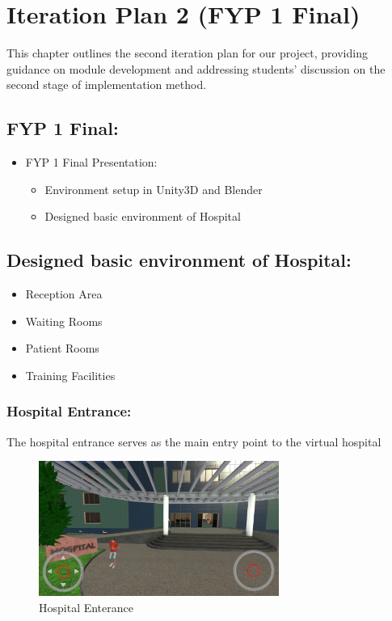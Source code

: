 \chapter{Iteration Plan 2 (FYP 1 Final)}
\label{ch:iter2}
This chapter outlines the second iteration plan for our project, providing guidance on module development and addressing students' discussion on the second stage of implementation method.

\section{FYP 1 Final:}
\begin{itemize}
    \item FYP 1 Final Presentation: \begin{itemize}
    \item Environment setup in Unity3D and Blender 
    \item Designed basic environment of Hospital
    \end{itemize}
\end{itemize}

\section{Designed basic environment of Hospital:}
	\begin{itemize}
	\item Reception Area
	\item Waiting Rooms
	\item Patient Rooms
	\item Training Facilities
\end{itemize}	
	
\subsection{Hospital Entrance:}
The hospital entrance serves as the main entry point to the virtual hospital
	\begin{figure}[h]
		\centering
		\includegraphics[width=0.7\textwidth, height=0.3\textheight]{Images/Hospital Enterance.png}
		\caption{Hospital Enterance}
		\label{fig:system-diagram}
	\end{figure}
\newline

